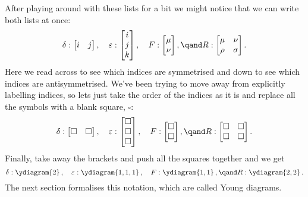 \documentclass[fleqn]{NotesClass}
\begin{document}
    After playing around with these lists for a bit we might notice that we can write both lists at once:
    \begin{equation}
        \delta: 
        \begin{bmatrix}
            i & j
        \end{bmatrix}
        , \quad \varepsilon: 
        \begin{bmatrix}
            i\\
            j\\
            k
        \end{bmatrix}
        , \quad F:
        \begin{bmatrix}
            \mu\\
            \nu
        \end{bmatrix}
        , \qand R: 
        \begin{bmatrix}
            \mu & \nu\\
            \rho & \sigma
        \end{bmatrix}
        .
    \end{equation}
    Here we read across to see which indices are symmetrised and down to see which indices are antisymmetrised.
    We've been trying to move away from explicitly labelling indices, so lets just take the order of the indices as it is and replace all the symbols with a blank square, \(\square\):
    \begin{equation}
        \delta: 
        \begin{bmatrix}
            \square & \square
        \end{bmatrix}
        , \quad \varepsilon: 
        \begin{bmatrix}
            \square\\
            \square\\
            \square
        \end{bmatrix}
        , \quad F:
        \begin{bmatrix}
            \square\\
            \square
        \end{bmatrix}
        , \qand R: 
        \begin{bmatrix}
            \square & \square\\
            \square & \square
        \end{bmatrix}
        .
    \end{equation}
    Finally, take away the brackets and push all the squares together and we get
    \begin{equation}
        \delta: \ydiagram{2}\,, \quad \varepsilon:\ydiagram{1,1,1}\,, \quad F: \ydiagram{1,1}\,, \qand R: \ydiagram{2,2}\,.
    \end{equation}
    The next section formalises this notation, which are called Young diagrams.
    
\end{document}
